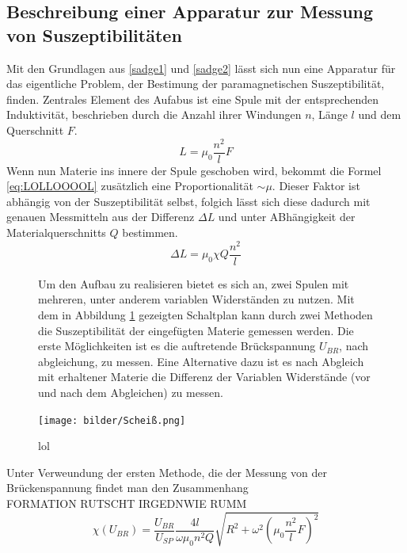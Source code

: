 \subsection{Beschreibung einer Apparatur zur Messung von Suszeptibilitäten}
Mit den Grundlagen aus \ref{sadge1} und \ref{sadge2} lässt sich nun eine Apparatur für das eigentliche Problem, der Bestimung 
der paramagnetischen Suszeptibilität, finden. 
Zentrales Element des Aufabus ist eine Spule mit der entsprechenden Induktivität, beschrieben durch die Anzahl ihrer Windungen $n$, Länge $l$
und dem Querschnitt $F$. 
\begin{equation}
    \label{eq:LOLLOOOOL}
    L = \mu_0 \frac{n^2}{l}F
\end{equation}
Wenn nun Materie ins innere der Spule geschoben wird, bekommt die Formel \eqref{eq:LOLLOOOOL} zusätzlich eine Proportionalität 
$ \sim \mu$. Dieser Faktor ist abhängig von der Suszeptibilität selbst, folgich lässt sich diese dadurch mit genauen Messmitteln aus der Differenz $\Delta L$ und unter ABhängigkeit der Materialquerschnitts $Q$
bestimmen.
\begin{equation}
    \label{eqn:werdasliestistdummXD}
    \Delta L = \mu_0 \chi Q \frac{n^2}{l}
\end{equation}
\begin{figure}
\begin{minipage}{0.5\textwidth}
Um den Aufbau zu realisieren bietet es sich an, zwei Spulen mit mehreren, unter anderem variablen Widerständen zu nutzen.
Mit dem in Abbildung \ref{fig:scheißplan} gezeigten Schaltplan kann durch zwei Methoden die Suszeptibilität der eingefügten Materie gemessen werden.
Die erste Möglichkeiten ist es die auftretende Brückspannung $U_{BR}$, nach abgleichung, zu messen. Eine Alternative dazu 
ist es nach Abgleich mit erhaltener Materie die Differenz der Variablen Widerstände (vor und nach dem Abgleichen) zu messen.
\end{minipage}
\hfill
\begin{minipage}{0.4\textwidth}
    \texttt{[image: bilder/Scheiß.png]}
    \caption{lol}
    \label{fig:scheißplan}
\end{minipage}
\end{figure}
Unter Verweundung der ersten Methode, die der Messung von der Brückenspannung findet man den Zusammenhang
\\FORMATION RUTSCHT IRGEDNWIE RUMM
\begin{equation}
    \label{eqn:werdasliestistOMEGAdummXD}
    \chi(U_{BR})= \frac{U_{BR}}{U_{SP}} \frac{4l}{\omega \mu_0 n^2 Q} \sqrt{R^2+\omega^2 \left( \mu_0 \frac{n^2}{l}F \right)^2}
\end{equation}
